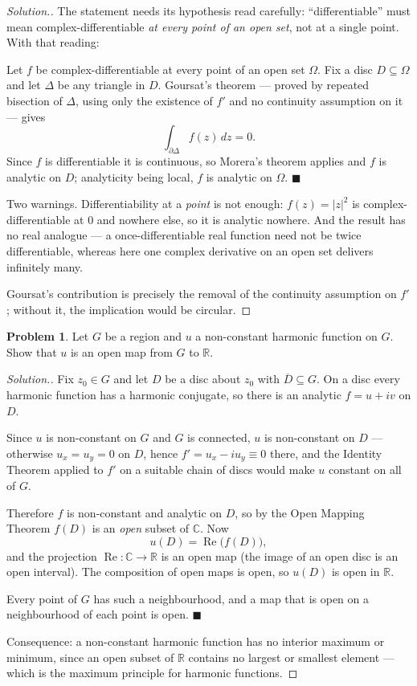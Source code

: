 \documentclass[11pt,a4paper]{article}
\theoremstyle{definition}
\newtheorem{problemx}{Problem}[section]
\newenvironment{problem}{\begin{problemx}}{\end{problemx}}
\newenvironment{solution}
  {\renewcommand{\qedsymbol}{}\begin{proof}[\textit{Solution}.]}
  {\end{proof}}
\begin{document}
\begin{solution}
The statement needs its hypothesis read carefully: ``differentiable'' must mean
complex-differentiable \emph{at every point of an open set}, not at a single point.
With that reading:

Let $f$ be complex-differentiable at every point of an open set $\Omega$. Fix a
disc $D \subseteq \Omega$ and let $\Delta$ be any triangle in $D$. Goursat's
theorem --- proved by repeated bisection of $\Delta$, using only the existence of
$f'$ and no continuity assumption on it --- gives
$$\int_{\partial\Delta} f(z)\,dz = 0 .$$
Since $f$ is differentiable it is continuous, so Morera's theorem applies and $f$
is analytic on $D$; analyticity being local, $f$ is analytic on $\Omega$.
$\blacksquare$

Two warnings. Differentiability at a \emph{point} is not enough:
$f(z) = \left|z\right|^{2}$ is complex-differentiable at $0$ and nowhere else, so
it is analytic nowhere. And the result has no real analogue --- a once-differentiable
real function need not be twice differentiable, whereas here one complex derivative
on an open set delivers infinitely many.

Goursat's contribution is precisely the removal of the continuity assumption on
$f'$; without it, the implication would be circular.
\end{solution}


\begin{problem}
Let $G$ be a region and $u$ a non-constant harmonic function on $G$. Show that
$u$ is an open map from $G$ to $\mathbb{R}$.
\end{problem}

\begin{solution}
Fix $z_0 \in G$ and let $D$ be a disc about $z_0$ with $\overline{D} \subseteq G$.
On a disc every harmonic function has a harmonic conjugate, so there is an analytic
$f = u + iv$ on $D$.

Since $u$ is non-constant on $G$ and $G$ is connected, $u$ is non-constant on $D$
--- otherwise $u_x = u_y = 0$ on $D$, hence $f' = u_x - iu_y \equiv 0$ there, and
the Identity Theorem applied to $f'$ on a suitable chain of discs would make $u$
constant on all of $G$.

Therefore $f$ is non-constant and analytic on $D$, so by the Open Mapping Theorem
$f(D)$ is an \emph{open} subset of $\mathbb{C}$. Now
$$u(D) = \operatorname{Re}\big(f(D)\big),$$
and the projection $\operatorname{Re} : \mathbb{C} \rightarrow \mathbb{R}$ is an
open map (the image of an open disc is an open interval). The composition of open
maps is open, so $u(D)$ is open in $\mathbb{R}$.

Every point of $G$ has such a neighbourhood, and a map that is open on a
neighbourhood of each point is open. $\blacksquare$

Consequence: a non-constant harmonic function has no interior maximum or minimum,
since an open subset of $\mathbb{R}$ contains no largest or smallest element ---
which is the maximum principle for harmonic functions.
\end{solution}
\end{document}

